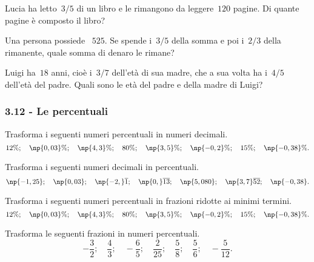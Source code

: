 \begin{esercizio}[\Ast]
 \label{ese:3.78}
Lucia ha letto~$3/5$ di un libro e le rimangono da leggere~$120$ pagine. Di quante pagine è composto il libro?
\end{esercizio}

\begin{esercizio}[\Ast]
 \label{ese:3.79}
Una persona possiede \officialeuro~$525$. Se spende i~$3/5$ della somma e poi i~$2/3$ della rimanente,
quale somma di denaro le rimane?
\end{esercizio}

\begin{esercizio}
 \label{ese:3.80}
Luigi ha~$18$ anni, cioè i~$3/7$ dell'età di sua madre, che a sua volta ha i~$4/5$ dell'età
del padre. Quali sono le età del padre e della madre di Luigi?
\end{esercizio}

\subsubsection*{3.12 - Le percentuali}

\begin{esercizio}
 \label{ese:3.81}
Trasforma i seguenti numeri percentuali in numeri decimali.
\[12\%;\quad \np{0,03}\%;\quad \np{4,3}\%;\quad 80\%;\quad \np{3,5}\%;\quad\np{-0,2}\%;\quad 15\%;\quad\np{-0,38}\%.\]
\end{esercizio}

\begin{esercizio}
 \label{ese:3.82}
Trasforma i seguenti numeri decimali in percentuali.
\[\np{-1,25};\quad \np{0,03};\quad \np{-2,}\overline{1};\quad \np{0,}\overline{13};\quad \np{5,080};\quad \np{3,7}\overline{52};\quad \np{-0,38}.\]
\end{esercizio}

\begin{esercizio}
 \label{ese:3.83}
Trasforma i seguenti numeri percentuali in frazioni ridotte ai minimi termini.
\[12\%;\quad \np{0,03}\%;\quad \np{4,3}\%;\quad 80\%;\quad \np{3,5}\%;\quad \np{-0,2}\%;\quad 15\%;\quad\np{-0,38}\%.\]
\end{esercizio}

\begin{esercizio}
\label{ese:3.84}
Trasforma le seguenti frazioni in numeri percentuali.
\[-\frac{3}{2};\quad\frac{4}{3};\quad-\frac{6}{5};\quad\frac{2}{25};\quad\frac{5}{8};
\quad\frac{5}{6};\quad-\frac{5}{12}.\]
\end{esercizio}

